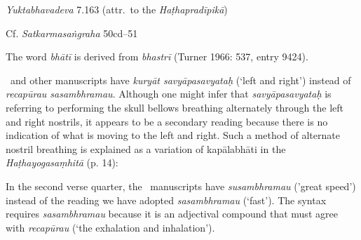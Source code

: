 \begin{ekdosis}
\begin{testimonia}[hp02_036]
\emph{Yuktabhavadeva} 7.163 (attr.~to the \emph{Haṭhapradīpikā})

\begin{versinnote}
\end{versinnote}

Cf. \emph{Satkarmasaṅgraha} 50cd–51

\begin{versinnote}
\end{versinnote}

\end{testimonia}

\begin{philcomm}[hp02_036]
The word \emph{bhātī} is derived from \emph{bhastrī} (Turner 1966: 537, entry 9424).

\etaTwo\ and other manuscripts have \emph{kuryāt savyāpasavyataḥ} (‘left and right’) instead of \emph{recapūrau sasambhramau}. Although one might infer that \emph{savyāpasavyataḥ} is referring to performing the skull bellows breathing alternately through the left and right nostrils, it appears to be a secondary reading because there is no indication of what is moving to the left and right. Such a method of alternate nostril breathing is explained as a variation of kapālabhāti in the \emph{Haṭhayogasaṃhitā} (p. 14):
\begin{versinnote}
\end{versinnote}

In the second verse quarter, the \textalpha\ manuscripts have \emph{susambhramau} ('great speed') instead of the reading we have adopted \emph{sasambhramau} (`fast'). The syntax requires \emph{sasambhramau} because it is an adjectival compound that must agree with \emph{recapūrau} (`the exhalation and inhalation').  
\end{philcomm}


\end{ekdosis}
